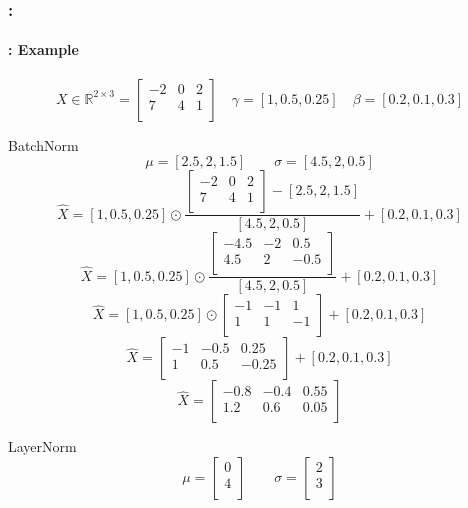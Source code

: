 \documentclass[xcolor=table]{beamer}
\begin{document}
\begin{frame}
	\frametitle{\insertshortsubtitle: \insertsection}
	\framesubtitle{\insertsubsection: Example}
	
	\[
	X \in \mathbb{R}^{2\times 3} = \begin{bmatrix}
		-2 & 0 & 2 \\
		7 & 4 & 1 \\
	\end{bmatrix}
	\quad 
	\gamma = [1, 0.5, 0.25]
	\quad 
	\beta = [0.2, 0.1, 0.3]
	\]
	
	\begin{minipage}{0.49\textwidth}
		\begin{exampleblock}{BatchNorm}
			\tiny
			\[\mu = [2.5, 2, 1.5] \quad\quad \sigma = [4.5, 2, 0.5]\]
			\[\hat{X} = [1, 0.5, 0.25] \odot \frac{\begin{bmatrix}
					-2 & 0 & 2 \\
					7 & 4 & 1 \\
				\end{bmatrix} - [2.5, 2, 1.5]}{[4.5, 2, 0.5]} + [0.2, 0.1, 0.3]\]
			\[\hat{X} = [1, 0.5, 0.25] \odot \frac{\begin{bmatrix}
					-4.5 & -2 & 0.5 \\
					4.5 & 2 & -0.5 \\
				\end{bmatrix}}{[4.5, 2, 0.5]} + [0.2, 0.1, 0.3]\]
			\[\hat{X} = [1, 0.5, 0.25] \odot \begin{bmatrix}
					-1 & -1 & 1 \\
					1  & 1 & -1 \\
			\end{bmatrix} + [0.2, 0.1, 0.3]\]
			\[\hat{X} = \begin{bmatrix}
				-1 & -0.5 & 0.25 \\
				1  & 0.5 & -0.25 \\
			\end{bmatrix} + [0.2, 0.1, 0.3]\]
			\[\hat{X} = \begin{bmatrix}
				-0.8 & -0.4 & 0.55 \\
				1.2  & 0.6 & 0.05 \\
			\end{bmatrix}\]
		\end{exampleblock}
	\end{minipage}
	\begin{minipage}{0.49\textwidth}
		\begin{exampleblock}{LayerNorm}
			\tiny
			\[\mu = \begin{bmatrix} 0\\4\\\end{bmatrix} \quad\quad \sigma = \begin{bmatrix} 2\\3\\\end{bmatrix}\]

\end{exampleblock}
\end{minipage}
\end{frame}
\end{document}
